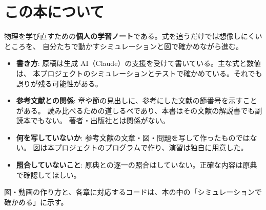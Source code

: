\chapter{この本について}\label{ch:preface}

物理を学び直すための\textbf{個人の学習ノート}である。式を追うだけでは想像しにくいところを、
自分たちで動かすシミュレーションと図で確かめながら進む。

\begin{itemize}
  \item \textbf{書き方}: 原稿は生成 AI（Claude）の支援を受けて書いている。主な式と数値は、
    本プロジェクトのシミュレーションとテストで確かめている。それでも誤りが残る可能性がある。
  \item \textbf{参考文献との関係}: 章や節の見出しに、参考にした文献の節番号を示すことがある。
    読み比べるための道しるべであり、本書はその文献の解説書でも副読本でもない。
    著者・出版社とは関係がない。
  \item \textbf{何を写していないか}: 参考文献の文章・図・問題を写して作ったものではない。
    図は本プロジェクトのプログラムで作り、演習は独自に用意した。
  \item \textbf{照合していないこと}: 原典との逐一の照合はしていない。正確な内容は原典で確認してほしい。
\end{itemize}

図・動画の作り方と、各章に対応するコードは、本の中の「シミュレーションで確かめる」に示す。
